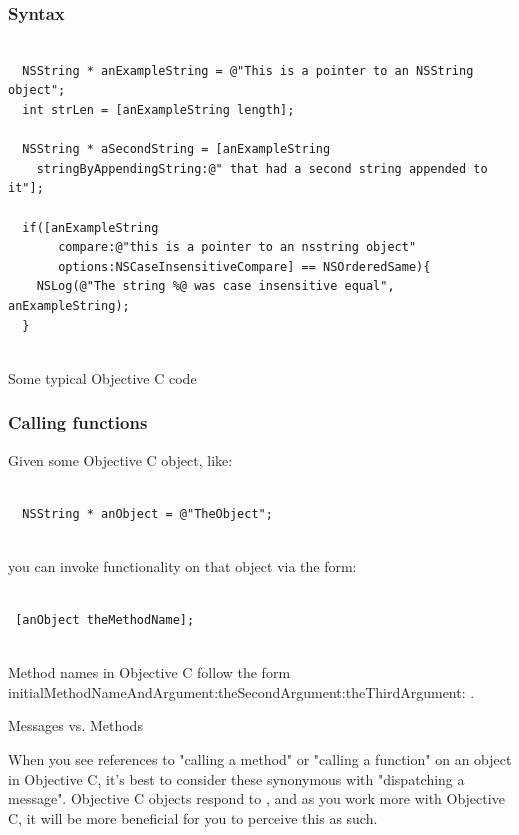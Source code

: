 \documentclass[10pt]{beamer}
\begin{document}
    
\begin{frame}[fragile]
  \frametitle{Syntax}
  \begin{listing}[H]
    \begin{verbatim}
  
  NSString * anExampleString = @"This is a pointer to an NSString object";
  int strLen = [anExampleString length];
             
  NSString * aSecondString = [anExampleString
    stringByAppendingString:@" that had a second string appended to it"];
            
  if([anExampleString
       compare:@"this is a pointer to an nsstring object"
       options:NSCaseInsensitiveCompare] == NSOrderedSame){
    NSLog(@"The string %@ was case insensitive equal", anExampleString);
  }
            
  \end{verbatim}
    \caption{Some typical Objective C code}
    \label{listing:4}
  \end{listing}

\end{frame}

    
\begin{frame}[fragile]
  \frametitle{Calling functions}
  Given some Objective C object, like:
\begin{verbatim}
  
  NSString * anObject = @"TheObject";
            
  \end{verbatim}

you can invoke functionality on that object via the form:
\begin{verbatim}
 
 [anObject theMethodName];
           
 \end{verbatim}

Method names in Objective C follow the form initialMethodNameAndArgument:theSecondArgument:theThirdArgument: . 
\begin{block}{Messages vs. Methods}
  
  When you see references to "calling a method" or "calling a function" on an object in Objective C, it's best to
  consider these synonymous with "dispatching a message".  Objective C objects respond to
  , and as you work more with Objective C, it will be more beneficial for
  you to perceive this as such.  
            
  \end{block}

\end{frame}
\end{document}
